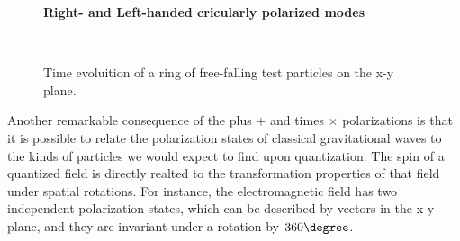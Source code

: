 \begin{figure}
\centering
    \textbf{ Right- and Left-handed cricularly polarized modes}\par\medskip
\centering

 \quad
{} \\
\caption{Time evoluition of a ring of free-falling test particles on the x-y plane.}
\label{plus_and_times}

\end{figure}
Another remarkable consequence of the plus $+$ and times $\times$ polarizations is that it is possible to relate the polarization states of classical gravitational waves to the kinds of particles we would expect to find upon quantization.
The spin of a quantized field is directly realted to the transformation properties of that field under spatial rotations.
For instance, the electromagnetic field has two independent polarization states, which can be described by vectors in the x-y plane, and they are invariant under a rotation by $360 \degree$.

